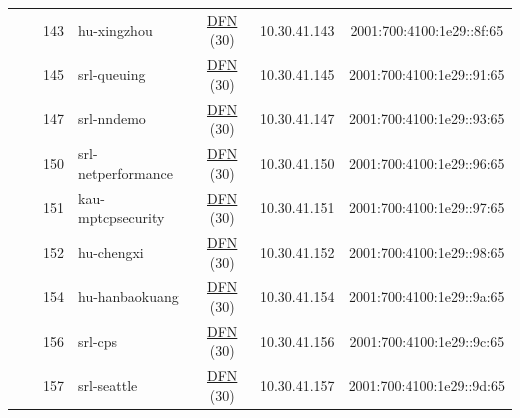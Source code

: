 \begin{small}
\begin{center}
\begin{longtable}{|c|c|c|c|c|c|c|c|}
  &  & \tiny{143} & \multicolumn{1}{|l|}{\tiny{hu-xingzhou}} & \multicolumn{2}{|c|}{\tiny{\href{https://www.dfn.de}{DFN} (30)}} & \tiny{10.30.41.143} & \tiny{2001:700:4100:1e29::8f:65} \\* \cline{3-3}\cline{4-4}\cline{5-5}\cline{6-6}\cline{7-7}\cline{8-8}
  &  & \tiny{145} & \multicolumn{1}{|l|}{\tiny{srl-queuing}} & \multicolumn{2}{|c|}{\tiny{\href{https://www.dfn.de}{DFN} (30)}} & \tiny{10.30.41.145} & \tiny{2001:700:4100:1e29::91:65} \\* \cline{3-3}\cline{4-4}\cline{5-5}\cline{6-6}\cline{7-7}\cline{8-8}
  &  & \tiny{147} & \multicolumn{1}{|l|}{\tiny{srl-nndemo}} & \multicolumn{2}{|c|}{\tiny{\href{https://www.dfn.de}{DFN} (30)}} & \tiny{10.30.41.147} & \tiny{2001:700:4100:1e29::93:65} \\* \cline{3-3}\cline{4-4}\cline{5-5}\cline{6-6}\cline{7-7}\cline{8-8}
  &  & \tiny{150} & \multicolumn{1}{|l|}{\tiny{srl-netperformance}} & \multicolumn{2}{|c|}{\tiny{\href{https://www.dfn.de}{DFN} (30)}} & \tiny{10.30.41.150} & \tiny{2001:700:4100:1e29::96:65} \\* \cline{3-3}\cline{4-4}\cline{5-5}\cline{6-6}\cline{7-7}\cline{8-8}
  &  & \tiny{151} & \multicolumn{1}{|l|}{\tiny{kau-mptcpsecurity}} & \multicolumn{2}{|c|}{\tiny{\href{https://www.dfn.de}{DFN} (30)}} & \tiny{10.30.41.151} & \tiny{2001:700:4100:1e29::97:65} \\* \cline{3-3}\cline{4-4}\cline{5-5}\cline{6-6}\cline{7-7}\cline{8-8}
  &  & \tiny{152} & \multicolumn{1}{|l|}{\tiny{hu-chengxi}} & \multicolumn{2}{|c|}{\tiny{\href{https://www.dfn.de}{DFN} (30)}} & \tiny{10.30.41.152} & \tiny{2001:700:4100:1e29::98:65} \\* \cline{3-3}\cline{4-4}\cline{5-5}\cline{6-6}\cline{7-7}\cline{8-8}
  &  & \tiny{154} & \multicolumn{1}{|l|}{\tiny{hu-hanbaokuang}} & \multicolumn{2}{|c|}{\tiny{\href{https://www.dfn.de}{DFN} (30)}} & \tiny{10.30.41.154} & \tiny{2001:700:4100:1e29::9a:65} \\* \cline{3-3}\cline{4-4}\cline{5-5}\cline{6-6}\cline{7-7}\cline{8-8}
  &  & \tiny{156} & \multicolumn{1}{|l|}{\tiny{srl-cps}} & \multicolumn{2}{|c|}{\tiny{\href{https://www.dfn.de}{DFN} (30)}} & \tiny{10.30.41.156} & \tiny{2001:700:4100:1e29::9c:65} \\* \cline{3-3}\cline{4-4}\cline{5-5}\cline{6-6}\cline{7-7}\cline{8-8}
  &  & \tiny{157} & \multicolumn{1}{|l|}{\tiny{srl-seattle}} & \multicolumn{2}{|c|}{\tiny{\href{https://www.dfn.de}{DFN} (30)}} & \tiny{10.30.41.157} & \tiny{2001:700:4100:1e29::9d:65} \\* \cline{3-3}\cline{4-4}\cline{5-5}\cline{6-6}\cline{7-7}\cline{8-8}

\end{longtable}
\end{center}
\end{small}
